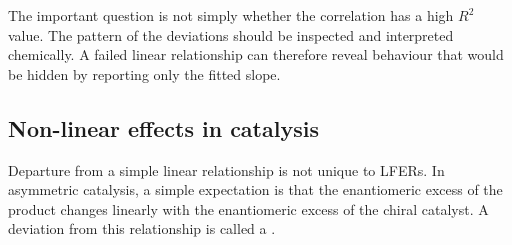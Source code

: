 The important question is not simply whether the correlation has a high $R^2$ value.
The pattern of the deviations should be inspected and interpreted chemically.
A failed linear relationship can therefore reveal behaviour that would be hidden by reporting only the fitted slope.

\subsection{Non-linear effects in catalysis}

  Departure from a simple linear relationship is not unique to LFERs.
  In asymmetric catalysis, a simple expectation is that the enantiomeric excess of the product changes linearly with the enantiomeric excess of the chiral catalyst.
  A deviation from this relationship is called a .

